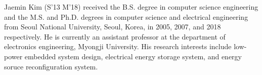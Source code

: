 \documentclass[journal]{./template/IEEEtran}
\begin{document}
\begin{IEEEbiography}{Jaemin Kim}
(S'13 M'18) received the B.S. degree in computer science engineering and the M.S. and Ph.D. degrees in computer science and electrical engineering from Seoul National University, Seoul, Korea, in 2005, 2007, and 2018 respectively. He is currently an assistant professor at the department of electronics engineering, Myongji University. His research interests include low-power embedded system design, electrical energy storage system, and energy soruce reconfiguration system.
\end{IEEEbiography}
\end{document}
